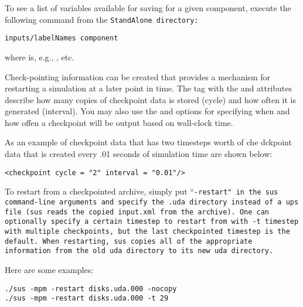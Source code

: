 To see a list of
variables available for saving for a given component, execute the following
command from the \tt StandAlone \normalfont directory:

\begin{Verbatim}[fontsize=\footnotesize]
inputs/labelNames component
\end{Verbatim}
where  is, e.g., ,  etc.

Check-pointing information can be created that provides a mechanism for
restarting a simulation at a later point in time.  The 
tag with the  and  attributes describe how many
copies of checkpoint data is stored (cycle) and how often it is generated
(interval).  You may also use the  and 
options for specifying when and how offen a checkpoint will be output based
on wall-clock time.

As an example of checkpoint data that has two timesteps worth of
che dckpoint data that is created every .01 seconds of simulation time
are shown below:

\begin{Verbatim}[fontsize=\footnotesize]
<checkpoint cycle = "2" interval = "0.01"/>
\end{Verbatim}

To restart from a checkpointed archive, simply put ``\tt -restart\normalfont" in the
sus command-line arguments and specify the .uda directory instead of
a ups file (sus reads the copied \tt input.xml \normalfont from the
archive).  One can optionally specify a certain timestep to restart
from with \tt -t timestep \normalfont with multiple checkpoints, but the
last checkpointed timestep is the default.  When restarting, sus
copies all of the appropriate information from the old uda directory to its
new uda directory.

Here are some examples:

\begin{Verbatim}[fontsize=\footnotesize]
./sus -mpm -restart disks.uda.000 -nocopy
./sus -mpm -restart disks.uda.000 -t 29
\end{Verbatim}
%

